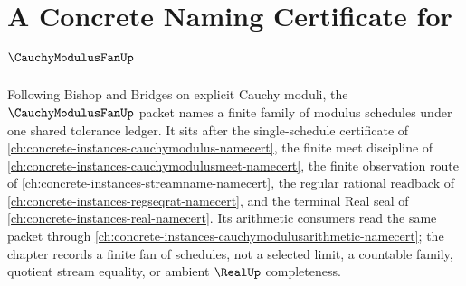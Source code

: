 \chapter{A Concrete Naming Certificate for $\CauchyModulusFanUp$}
\label{ch:concrete-instances-cauchy-modulus-fan-namecert}

Following Bishop and Bridges on explicit Cauchy moduli, the $\CauchyModulusFanUp$ packet names a finite family of modulus schedules under one shared tolerance ledger. It sits after the single-schedule certificate of \autoref{ch:concrete-instances-cauchymodulus-namecert}, the finite meet discipline of \autoref{ch:concrete-instances-cauchymodulusmeet-namecert}, the finite observation route of \autoref{ch:concrete-instances-streamname-namecert}, the regular rational readback of \autoref{ch:concrete-instances-regseqrat-namecert}, and the terminal Real seal of \autoref{ch:concrete-instances-real-namecert}. Its arithmetic consumers read the same packet through \autoref{ch:concrete-instances-cauchymodulusarithmetic-namecert}; the chapter records a finite fan of schedules, not a selected limit, a countable family, quotient stream equality, or ambient $\RealUp$ completeness.

